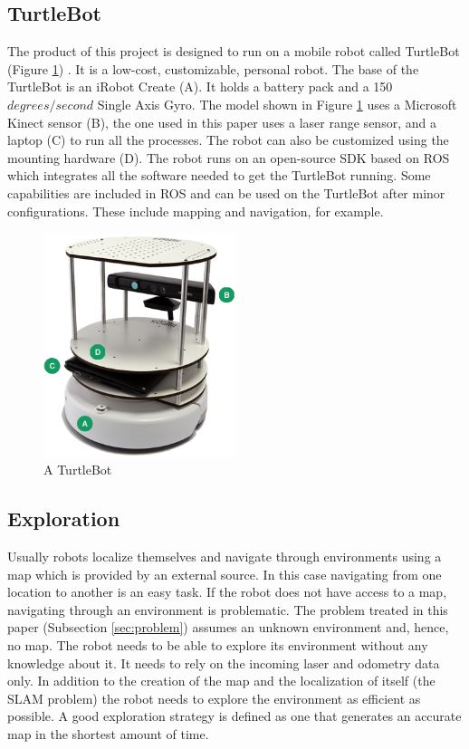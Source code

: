 \documentclass{ba-kecs}
\begin{document}
\subsection{TurtleBot}
\label{subsec:turtle}
The product of this project is designed to run on a mobile robot called TurtleBot (Figure \ref{fig:turtlebot}) \citep{turtlebot}. It is a low-cost, customizable, personal robot. The base of the TurtleBot is an iRobot Create (A). It holds a battery pack and a 150 $degrees/second$ Single Axis Gyro. The model shown in Figure \ref{fig:turtlebot} uses a Microsoft Kinect sensor (B), the one used in this paper uses a laser range sensor, and a laptop (C) to run all the processes. The robot can also be customized using the mounting hardware (D). The robot runs on an open-source SDK based on ROS which integrates all the software needed to get the TurtleBot running. Some capabilities are included in ROS and can be used on the TurtleBot after minor configurations. These include mapping and navigation, for example. 
\begin{figure}[h]
	\centering
		\includegraphics[width=0.50\textwidth]{figures/turtlebot.png}
	\caption{A TurtleBot \citep{turtlebot}}
	\label{fig:turtlebot}
\end{figure}

\subsection{Exploration}
\label{subsec:sotaExplore}
Usually robots localize themselves and navigate through environments using a map which is provided by an external source. In this case navigating from one location to another is an easy task. If the robot does not have access to a map, navigating through an environment is problematic. The problem treated in this paper (Subsection \ref{sec:problem}) assumes an unknown environment and, hence, no map. The robot needs to be able to explore its environment without any knowledge about it. It needs to rely on the incoming laser and odometry data only. In addition to the creation of the map and the localization of itself (the SLAM problem) the robot needs to explore the environment as efficient as possible. A good exploration strategy is defined as one that generates an accurate map in the shortest amount of time.
\end{document}

